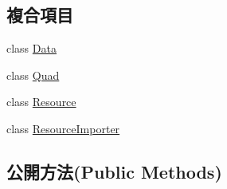 \subsection*{複合項目}
\begin{DoxyCompactItemize}
\item 
class \hyperlink{class_magnum_1_1_font_1_1_data}{Data}
\item 
class \hyperlink{class_magnum_1_1_font_1_1_quad}{Quad}
\item 
class \hyperlink{class_magnum_1_1_font_1_1_resource}{Resource}
\item 
class \hyperlink{class_magnum_1_1_font_1_1_resource_importer}{Resource\+Importer}
\end{DoxyCompactItemize}
\subsection*{公開方法(Public Methods)}
